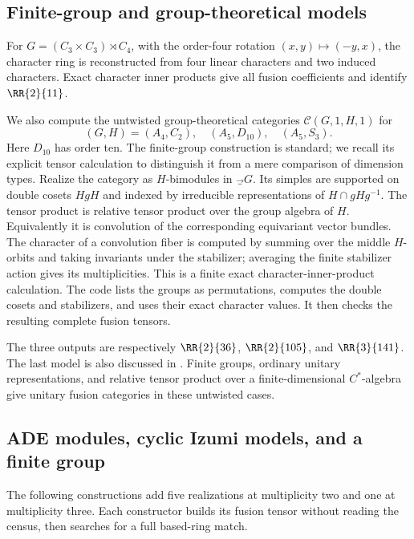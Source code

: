\subsection{Finite-group and group-theoretical models}
For $G=(C_3\times C_3)\rtimes C_4$, with the order-four rotation
$(x,y)\mapsto(-y,x)$, the character ring is reconstructed from four
linear characters and two induced characters. Exact character inner
products give all fusion coefficients and identify $\RR{2}{11}$.

We also compute the untwisted group-theoretical categories
$\mathcal C(G,1,H,1)$ for
\[
 (G,H)=(A_4,C_2),\quad(A_5,D_{10}),\quad(A_5,S_3).
\]
Here $D_{10}$ has order ten. The finite-group construction is standard;
we recall its explicit tensor calculation to distinguish it from a
mere comparison of dimension types. Realize the category as
$H$-bimodules in $\Vec_G$. Its simples are supported on double cosets
$HgH$ and indexed by irreducible representations of
$H\cap gHg^{-1}$. The tensor product is relative tensor product over
the group algebra of $H$. Equivalently it is convolution of the
corresponding equivariant vector bundles. The character of a convolution
fiber is computed by summing over the middle $H$-orbits and taking
invariants under the stabilizer; averaging the finite stabilizer action
gives its multiplicities. This is a finite exact character-inner-product
calculation. The code lists the groups as permutations, computes the
double cosets and stabilizers, and uses their exact character values.
It then checks the resulting complete fusion tensors.

The three outputs are respectively $\RR{2}{36}$,
$\RR{2}{105}$, and $\RR{3}{141}$. The last model is also discussed in
\cite[Section~6.5]{Integral}. Finite groups, ordinary unitary
representations, and relative tensor product over a finite-dimensional
$C^*$-algebra give unitary fusion categories in these untwisted cases.

\subsection{ADE modules, cyclic Izumi models, and a finite group}\label{sec:additionalmodels}
The following constructions add five realizations at multiplicity two
and one at multiplicity three. Each constructor builds its fusion tensor
without reading the census, then searches for a full based-ring match.

